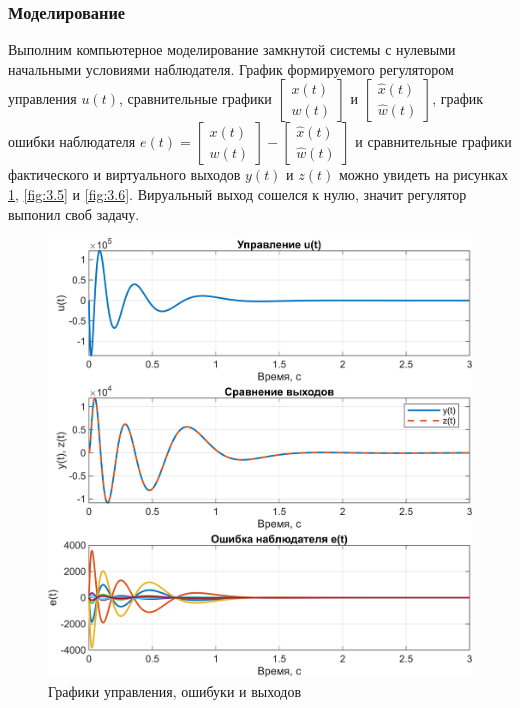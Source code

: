 \subsubsection{Моделирование}

Выполним компьютерное моделирование замкнутой системы с нулевыми
начальными условиями наблюдателя. График формируемого регулятором 
управления $u(t)$, сравнительные графики
$\begin{bmatrix}
    x(t)\\w(t)
\end{bmatrix}$ и
$\begin{bmatrix}
    \hat x(t)\\\hat w(t)
\end{bmatrix}$, 
график ошибки наблюдателя $e(t)=\begin{bmatrix}
    x(t)\\w(t)
\end{bmatrix} - \begin{bmatrix}
    \hat x(t)\\\hat w(t)
\end{bmatrix}$
и сравнительные графики фактического и виртуального выходов $y(t)$ и $z(t)$
можно увидеть на рисунках \ref{fig:3.4}, \ref{fig:3.5} и \ref{fig:3.6}.
Вируальный выход сошелся к нулю, значит регулятор выпонил своб задачу.

\begin{figure}[H]
    \centering
    \includegraphics[width=\linewidth]{figs/task3_4.png}
    \caption{Графики управления, ошибуки и выходов}
    \label{fig:3.4}
\end{figure}

